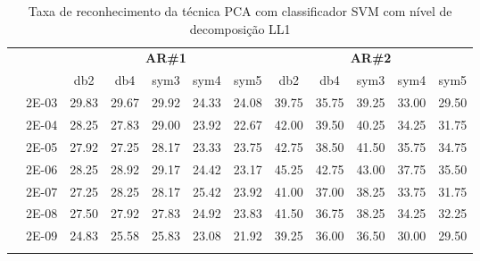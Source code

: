 \begin{table}[H]
\begin{tabular}{|c|c|c c c c c|c c c c c|}
	
	
\\\midrule
\end{tabular}

\end{table}



\begin{table}[H]
	\centering
    \normalsize
	\caption{Taxa de reconhecimento da técnica  PCA com classificador SVM com nível de decomposição LL1}
	\begin{tabular}{|c|c|c c c c c|c c c c c|}
\cline{3-12}
\multicolumn{2}{c|}{\multirow{2}{*}{}} & \multicolumn{5}{c|}{\textbf{AR\#1}}  & \multicolumn{5}{c|}{\textbf{AR\#2}} \\\cline{3-12}

\multicolumn{2}{c|}{}  & db2 & db4 & sym3 & sym4 & sym5 & db2 & db4& sym3 & sym4 & sym5 \\\hline
\multicolumn{1}{|c|}{ \multirow{6}{*}{\rotatebox[origin=c]{90}{\textbf{Gamma}}} }
&2E-03&	29.83&	29.67&	29.92&	24.33&	24.08&	39.75&	35.75&	39.25&	33.00&	29.50	\\\cline{2-12}
&2E-04&	28.25&	27.83&	29.00&	23.92&	22.67&	42.00&	39.50&	40.25&	34.25&	31.75	\\\cline{2-12}
&2E-05&	27.92&	27.25&	28.17&	23.33&	23.75&	42.75&	38.50&	41.50&	35.75&	34.75	\\\cline{2-12}
&2E-06&	28.25&	28.92&	29.17&	24.42&	23.17&	45.25&	42.75&	43.00&	37.75&	35.50	\\\cline{2-12}
&2E-07&	27.25&	28.25&	28.17&	25.42&	23.92&	41.00&	37.00&	38.25&	33.75&	31.75	\\\cline{2-12}
&2E-08&	27.50&	27.92&	27.83&	24.92&	23.83&	41.50&	36.75&	38.25&	34.25&	32.25	\\\cline{2-12}
&2E-09&	24.83&	25.58&	25.83&	23.08&	21.92&	39.25&	36.00&	36.50&	30.00&	29.50	

\\ \midrule
\multicolumn{12}{c}{}\\ 


\end{tabular}
\end{table}
